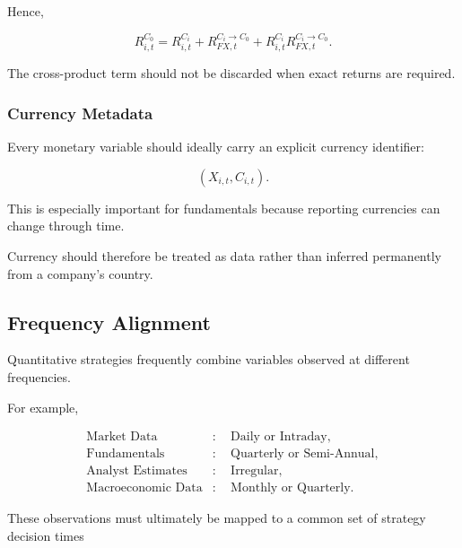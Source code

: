 \documentclass[11pt,a4paper]{article}
\begin{document}
Hence,

\begin{equation}
\boxed{
R_{i,t}^{C_0}
=
R_{i,t}^{C_i}
+
R_{FX,t}^{C_i\rightarrow C_0}
+
R_{i,t}^{C_i}
R_{FX,t}^{C_i\rightarrow C_0}.
}
\end{equation}

The cross-product term should not be discarded when exact returns are required.


\subsubsection{Currency Metadata}

Every monetary variable should ideally carry an explicit currency identifier:

\begin{equation}
\boxed{
\left(
X_{i,t},
C_{i,t}
\right).
}
\end{equation}

This is especially important for fundamentals because reporting currencies can
change through time.

Currency should therefore be treated as data rather than inferred permanently
from a company's country.


\subsection{Frequency Alignment}
\label{subsec:frequency_alignment}

Quantitative strategies frequently combine variables observed at different
frequencies.

For example,

\begin{equation}
\begin{aligned}
\text{Market Data}
&:\quad
\text{Daily or Intraday},
\\
\text{Fundamentals}
&:\quad
\text{Quarterly or Semi-Annual},
\\
\text{Analyst Estimates}
&:\quad
\text{Irregular},
\\
\text{Macroeconomic Data}
&:\quad
\text{Monthly or Quarterly}.
\end{aligned}
\end{equation}

These observations must ultimately be mapped to a common set of strategy
decision times
\end{document}
